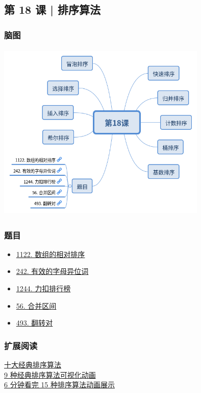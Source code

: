 \subsection{第 18 课 | 排序算法}

\subsubsection{脑图}

\includegraphics[width=100mm,height=86mm]{images/camp/第18课.png}

\subsubsection{题目}

\begin{itemize}
  \item \hyperref[leetcode:1122]{1122. 数组的相对排序}
  \item \hyperref[leetcode:242]{242. 有效的字母异位词}
  \item \hyperref[leetcode:1244]{1244. 力扣排行榜}
  \item \hyperref[leetcode:56]{56. 合并区间}
  \item \hyperref[leetcode:493]{493. 翻转对}
\end{itemize}

\subsubsection{扩展阅读}

\href{https://www.cnblogs.com/onepixel/p/7674659.html}{十大经典排序算法} \\
\href{https://www.bilibili.com/video/av25136272}{9 种经典排序算法可视化动画} \\
\href{https://www.bilibili.com/video/av63851336}{6 分钟看完 15 种排序算法动画展示}
